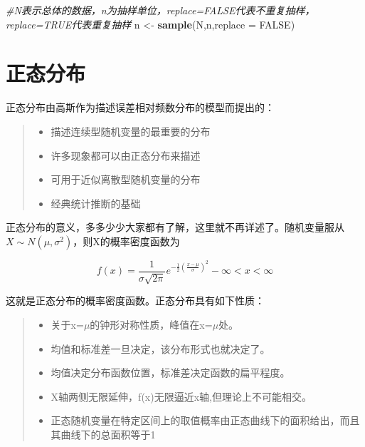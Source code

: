 \documentclass[]{ctexbook}
\newenvironment{Shaded}{\begin{snugshade}}{\end{snugshade}}
\newcommand{\CommentTok}[1]{\textcolor[rgb]{0.56,0.35,0.01}{\textit{#1}}}
\newcommand{\DataTypeTok}[1]{\textcolor[rgb]{0.13,0.29,0.53}{#1}}
\newcommand{\KeywordTok}[1]{\textcolor[rgb]{0.13,0.29,0.53}{\textbf{#1}}}
\newcommand{\NormalTok}[1]{#1}
\newcommand{\OtherTok}[1]{\textcolor[rgb]{0.56,0.35,0.01}{#1}}
\newcommand{\StringTok}[1]{\textcolor[rgb]{0.31,0.60,0.02}{#1}}
\providecommand{\tightlist}{%
  \setlength{\itemsep}{0pt}\setlength{\parskip}{0pt}}
\begin{document}
\begin{Shaded}
\begin{Highlighting}[]
\CommentTok{#N表示总体的数据，n为抽样单位，replace=FALSE代表不重复抽样，replace=TRUE代表重复抽样}
\NormalTok{n <-}\StringTok{ }\KeywordTok{sample}\NormalTok{(N,n,}\DataTypeTok{replace =} \OtherTok{FALSE}\NormalTok{)}
\end{Highlighting}
\end{Shaded}

\hypertarget{ux6b63ux6001ux5206ux5e03}{%
\section{正态分布}\label{ux6b63ux6001ux5206ux5e03}}

正态分布由高斯作为描述误差相对频数分布的模型而提出的：

\begin{quote}
\begin{itemize}
\tightlist
\item
  描述连续型随机变量的最重要的分布
\item
  许多现象都可以由正态分布来描述
\item
  可用于近似离散型随机变量的分布
\item
  经典统计推断的基础
\end{itemize}
\end{quote}

正态分布的意义，多多少少大家都有了解，这里就不再详述了。随机变量服从\(X\sim N (\mu,\sigma^2)\)，则X的概率密度函数为

\[f(x)=\frac{1}{\sigma\sqrt{2\pi}}e^{-\frac{1}{2}(\frac{x-\mu}{\sigma})^2} -\infty<x<\infty\]

这就是正态分布的概率密度函数。正态分布具有如下性质：

\begin{quote}
\begin{itemize}
\tightlist
\item
  关于x=\(\mu\)的钟形对称性质，峰值在x=\(\mu\)处。
\item
  均值和标准差一旦决定，该分布形式也就决定了。
\item
  均值决定分布函数位置，标准差决定函数的扁平程度。
\item
  X轴两侧无限延伸，f(x)无限逼近x轴,但理论上不可能相交。
\item
  正态随机变量在特定区间上的取值概率由正态曲线下的面积给出，而且其曲线下的总面积等于1
\end{itemize}
\end{quote}
\end{document}
